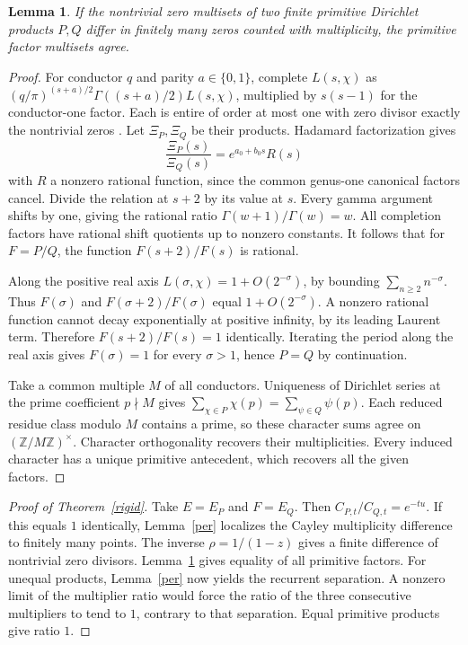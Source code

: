 \documentclass[11pt]{article}
\newtheorem{lemma}[theorem]{Lemma}
\newcommand{\Z}{\mathbb Z}
\begin{document}
\begin{lemma}\label{finite}
If the nontrivial zero multisets of two finite primitive Dirichlet
products $P,Q$ differ in finitely many zeros counted with multiplicity,
the primitive factor multisets agree.
\end{lemma}
\begin{proof}
For conductor $q$ and parity $a\in\{0,1\}$, complete $L(s,\chi)$ as
$(q/\pi)^{(s+a)/2}\Gamma((s+a)/2)L(s,\chi)$, multiplied by $s(s-1)$
for the conductor-one factor. Each is entire of order at most one with
zero divisor exactly the nontrivial zeros \cite{lagarias}.
Let $\Xi_P,\Xi_Q$ be their products. Hadamard factorization gives
\[
 \frac{\Xi_P(s)}{\Xi_Q(s)}=e^{a_0+b_0s} R(s)
\]
with $R$ a nonzero rational function, since the common genus-one
canonical factors cancel. Divide the relation at $s+2$ by its value at
$s$. Every gamma argument shifts by one, giving the rational ratio
$\Gamma(w+1)/\Gamma(w)=w$. All completion factors have rational shift
quotients up to nonzero constants. It follows that for $F=P/Q$, the
function $F(s+2)/F(s)$ is rational.

Along the positive real axis $L(\sigma,\chi)=1+O(2^{-\sigma})$,
by bounding $\sum_{n\ge2} n^{-\sigma}$. Thus $F(\sigma)$ and
$F(\sigma+2)/F(\sigma)$ equal $1+O(2^{-\sigma})$. A nonzero rational
function cannot decay exponentially at positive infinity, by its
leading Laurent term. Therefore $F(s+2)/F(s)=1$ identically. Iterating
the period along the real axis gives $F(\sigma)=1$ for every $\sigma>1$,
hence $P=Q$ by continuation.

Take a common multiple $M$ of all conductors. Uniqueness of Dirichlet
series at the prime coefficient $p\nmid M$ gives
$\sum_{\chi\in P}\chi(p)=\sum_{\psi\in Q}\psi(p)$.
Each reduced residue class modulo $M$ contains a prime, so these
character sums agree on $(\Z/M\Z)^\times$. Character orthogonality
recovers their multiplicities. Every induced character has a unique
primitive antecedent, which recovers all the given factors.
\end{proof}

\begin{proof}[Proof of Theorem~\ref{rigid}]
Take $E=E_P$ and $F=E_Q$. Then $C_{P,t}/C_{Q,t}=e^{-tu}$.
If this equals $1$ identically, Lemma~\ref{per} localizes the Cayley
multiplicity difference to finitely many points. The inverse
$\rho=1/(1-z)$ gives a finite difference of nontrivial zero divisors.
Lemma~\ref{finite} gives equality of all primitive factors. For
unequal products, Lemma~\ref{per} now yields the recurrent separation.
A nonzero limit of the multiplier ratio would force the ratio of the
three consecutive multipliers to tend to $1$, contrary to that
separation. Equal primitive products give ratio $1$.
\end{proof}
\end{document}
